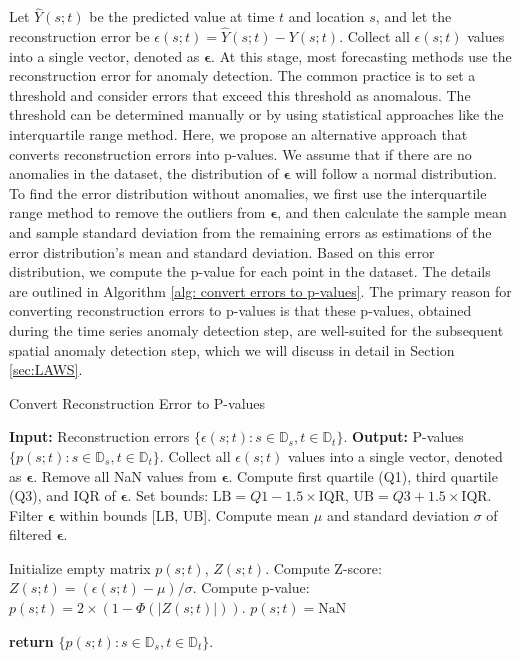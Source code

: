\documentclass[11pt]{article}
\begin{document}
Let $\hat{Y}(s;t)$ be the predicted value at time $t$ and location $s$, and let the reconstruction error be $\epsilon(s;t)=\hat{Y}(s;t)-Y(s;t)$. Collect all $\epsilon(s;t)$ values into a single vector, denoted as $\bm{\epsilon}$. At this stage, most forecasting methods use the reconstruction error for anomaly detection. The common practice is to set a threshold and consider errors that exceed this threshold as anomalous. The threshold can be determined manually or by using statistical approaches like the interquartile range method. Here, we propose an alternative approach that converts reconstruction errors into p-values. We assume that if there are no anomalies in the dataset, the distribution of $\bm{\epsilon}$ will follow a normal distribution. To find the error distribution without anomalies, we first use the interquartile range method to remove the outliers from $\bm{\epsilon}$, and then calculate the sample mean and sample standard deviation from the remaining errors as estimations of the error distribution's mean and standard deviation. Based on this error distribution, we compute the p-value for each point in the dataset. The details are outlined in Algorithm \ref{alg: convert errors to p-values}. The primary reason for converting reconstruction errors to p-values is that these p-values, obtained during the time series anomaly detection step, are well-suited for the subsequent spatial anomaly detection step, which we will discuss in detail in Section \ref{sec:LAWS}.




\begin{algorithm}
\caption{Convert Reconstruction Error to P-values}\label{alg: convert errors to p-values}
\begin{algorithmic}[1]
\State \textbf{Input:} Reconstruction errors $\{\epsilon(s;t):s\in \mathbb{D}_s, t\in \mathbb{D}_t\}$.
\State \textbf{Output:} P-values $\{p(s;t):s\in \mathbb{D}_s, t\in \mathbb{D}_t\}$.
\State Collect all $\epsilon(s;t)$ values into a single vector, denoted as $\bm{\epsilon}$.
\State Remove all NaN values from $\bm{\epsilon}$.
\State Compute first quartile (Q1), third quartile (Q3), and IQR of $\bm{\epsilon}$.
\State Set bounds: $\text{LB} = Q1 - 1.5 \times \text{IQR}$, $\text{UB} = Q3 + 1.5 \times \text{IQR}$.
\State Filter $\bm{\epsilon}$ within bounds [$\text{LB}$, $\text{UB}$].
\State Compute mean $\mu$ and standard deviation $\sigma$ of filtered $\bm{\epsilon}$.

\State Initialize empty matrix $p(s;t)$, $Z(s;t)$.
            \State Compute Z-score: $Z(s;t) = (\epsilon(s;t) - \mu)/\sigma$.
            \State Compute p-value: $p(s;t) = 2 \times (1 - \Phi(|Z(s;t)|))$.
        \Else
            \State $p(s;t) = \text{NaN}$
        \EndIf
    \EndFor
\EndFor

\State \textbf{return} $\{p(s;t):s\in \mathbb{D}_s, t\in \mathbb{D}_t\}$.
\end{algorithmic}
\end{algorithm}
\end{document}
